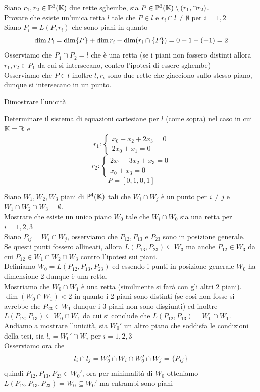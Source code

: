 \begin{ese}Siano $r_1, r_2\in \mathbb{P}^3(\mathbb{K})$ due rette sghembe, sia $P\in \mathbb{P}^3(\mathbb{K})\setminus( r_1, \cap r_2)$.\\
Provare che esiste un'unica retta $l$ tale che $P\in l$ e $r_i\cap l\neq \emptyset$ per $i=1,2$\\
Siano $P_i=L(P,r_i)$ che sono piani in quanto
$$ \dim P_i =\dim \{ P\} + \dim r_i -\dim (r_i\cap \left\{ P \right\}) = 0+1-(-1) = 2$$
Osserviamo che $P_1\cap P_2=l$ che \`e una retta (se i piani non fossero distinti allora $r_1,r_2\in P_1$ da cui si intersecano, contro l'ipotesi di essere sghembe)\\
Osserviamo che $P\in l$ inoltre $l,r_i$ sono due rette che giacciono sullo stesso piano, dunque si intersecano in un punto.
\begin{ex}Dimostrare l'unicit\`a
\end{ex}
\end{ese}
\begin{ex}Determinare il sistema di equazioni cartesiane per $l$ (come sopra) nel caso in cui $\mathbb{K}=\mathbb{R}$ e 
$$ r_1 :\begin{cases} x_0 - x_2 +2x_3= 0 \\ 2x_0 + x_1 =0 \end{cases}$$
$$ r_2:\begin{cases} 2x_1 - 3x_2 +x_3=0\\ x_0 + x_3 = 0\end{cases}$$ 
$$ P=[0,1, 0,1 ]$$
\end{ex}
\begin{ese}Siano $W_1,W_2,W_3$ piani di $\mathbb{P}^4(\mathbb{K})$ tali che $W_i\cap W_j$ \`e un punto per $i\neq j$ e $W_1\cap W_2\cap W_3=\emptyset$.\\
Mostrare che esiste un unico piano $W_0$ tale che $W_i\cap W_0$ sia una retta per $i=1,2,3$\\
Siano $P_{ij} = W_i\cap W_j$, osserviamo che $P_{12}, P_{13}$ e $P_{23}$ sono in posizione generale.\\
Se questi punti fossero allineati, allora $L(P_{13}, P_{23})\subseteq W_3$ ma anche $P_{12}\in W_3$ da cui $P_{12}\in W_1\cap W_2\cap W_3$ contro l'ipotesi sui piani.\\
Definiamo $W_0=L(P_{12}, P_{13},P_{23})$ ed essendo i punti in posizione generale $W_0$ ha dimensione $2$ dunque \`e una retta.\\
Mostriamo che $W_0\cap W_1$ \`e una retta (similmente si far\`a con gli altri 2 piani).\\
$\dim (W_0\cap W_1)<2$ in quanto i 2 piani sono distinti (se cos\`i non fosse si avrebbe che $P_{23}\in W_1$ dunque i 3 piani non sono disgiunti) ed inoltre $L(P_{12},P_{13}) \subseteq W_0 \cap W_1 $ da cui si conclude che $L(P_{12},P_{13}) =W_0\cap W_1$.\\
Andiamo a mostrare l'unicit\`a, sia $W_0'$ un altro piano che soddisfa le condizioni della tesi, sia $l_i =W_0'\cap W_i$ per $i=1,2,3$ \\
Osserviamo ora che $$l_i\cap l_j = W_0'\cap W_i \cap W_0' \cap W_j = \left\{ P_{ij} \right\}$$
quindi $P_{12}, P_{13},P_{23}\in W_0'$, ora per minimalit\`a di $W_0$ otteniamo $L(P_{12},P_{13}, P_{23}) = W_0\subseteq W_0'$ ma entrambi sono piani
\end{ese}
